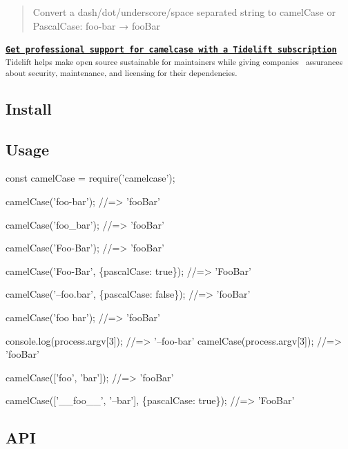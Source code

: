 \begin{quote}
Convert a dash/dot/underscore/space separated string to camel\+Case or Pascal\+Case\+: {\ttfamily foo-\/bar} → {\ttfamily foo\+Bar} \end{quote}




 {\bfseries  \href{https://tidelift.com/subscription/pkg/npm-camelcase?utm_source=npm-camelcase&utm_medium=referral&utm_campaign=readme}{\tt Get professional support for \textquotesingle{}camelcase\textquotesingle{} with a Tidelift subscription} } ~\newline
 \textsubscript{ Tidelift helps make open source sustainable for maintainers while giving companies~\newline
assurances about security, maintenance, and licensing for their dependencies. }  



\subsection*{Install}




\subsection*{Usage}


\begin{DoxyCode}
const camelCase = require('camelcase');

camelCase('foo-bar');
//=> 'fooBar'

camelCase('foo\_bar');
//=> 'fooBar'

camelCase('Foo-Bar');
//=> 'fooBar'

camelCase('Foo-Bar', \{pascalCase: true\});
//=> 'FooBar'

camelCase('--foo.bar', \{pascalCase: false\});
//=> 'fooBar'

camelCase('foo bar');
//=> 'fooBar'

console.log(process.argv[3]);
//=> '--foo-bar'
camelCase(process.argv[3]);
//=> 'fooBar'

camelCase(['foo', 'bar']);
//=> 'fooBar'

camelCase(['\_\_foo\_\_', '--bar'], \{pascalCase: true\});
//=> 'FooBar'
\end{DoxyCode}


\subsection*{A\+PI}

